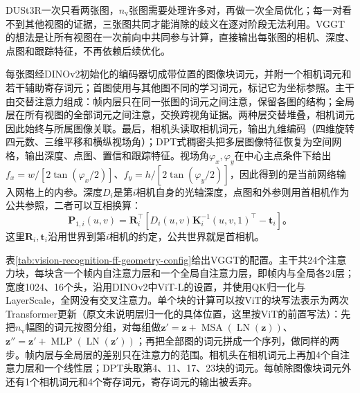 DUSt3R一次只看两张图，$n_{\mathrm v}$张图需要处理许多对，再做一次全局优化；每一对看不到其他视图的证据，三张图共同才能消除的歧义在逐对阶段无法利用。VGGT的想法是让所有视图在一次前向中共同参与计算，直接输出每张图的相机、深度、点图和跟踪特征，不再依赖后续优化。

每张图经DINOv2初始化的编码器切成带位置的图像块词元，并附一个相机词元和若干辅助寄存词元；首图使用与其他图不同的学习词元，标记它为坐标参照。主干由交替注意力组成：帧内层只在同一张图的词元之间注意，保留各图的结构；全局层在所有视图的全部词元之间注意，交换跨视角证据。两种层交替堆叠，相机词元因此始终与所属图像关联。最后，相机头读取相机词元，输出九维编码（四维旋转四元数、三维平移和横纵视场角）；DPT式稠密头把多层图像特征恢复为空间网格，输出深度、点图、置信和跟踪特征。视场角$\varphi_x,\varphi_y$在中心主点条件下给出$f_x=w/[2\tan(\varphi_x/2)]$、$f_y=h/[2\tan(\varphi_y/2)]$，因此得到的是当前网络输入网格上的内参。深度$D_i$是第$i$相机自身的光轴深度，点图和外参则用首相机作为公共参照，二者可以互相换算：
\begin{equation}
 \bm{P}_{1,i}(u,v)=
 \bm R_i^\top\left[
 D_i(u,v)\bm K_i^{-1}(u,v,1)^\top-\bm t_i\right]\text{。}
 \label{eq:vision-vggt-unprojection-process}
\end{equation}
这里$\bm R_i,\bm t_i$沿用世界到第$i$相机的约定，公共世界就是首相机。

表\ref{tab:vision-recognition-ff-geometry-config}给出VGGT的配置。主干共24个注意力块，每块含一个帧内自注意力层和一个全局自注意力层，即帧内与全局各24层；宽度1024、16个头，沿用DINOv2中ViT-L的设置，并使用QK归一化与LayerScale，全网没有交叉注意力。单个块的计算可以按ViT的块写法表示为两次Transformer更新（原文未说明层归一化的具体位置，这里按ViT的前置写法）：先把$n_{\mathrm v}$幅图的词元按图分组，对每组做$\bm z'=\bm z+\operatorname{MSA}(\operatorname{LN}(\bm z))$、$\bm z''=\bm z'+\operatorname{MLP}(\operatorname{LN}(\bm z'))$；再把全部图的词元拼成一个序列，做同样的两步。帧内层与全局层的差别只在注意力的范围。相机头在相机词元上再加4个自注意力层和一个线性层；DPT头取第4、11、17、23块的词元。每帧除图像块词元外还有1个相机词元和4个寄存词元，寄存词元的输出被丢弃。

